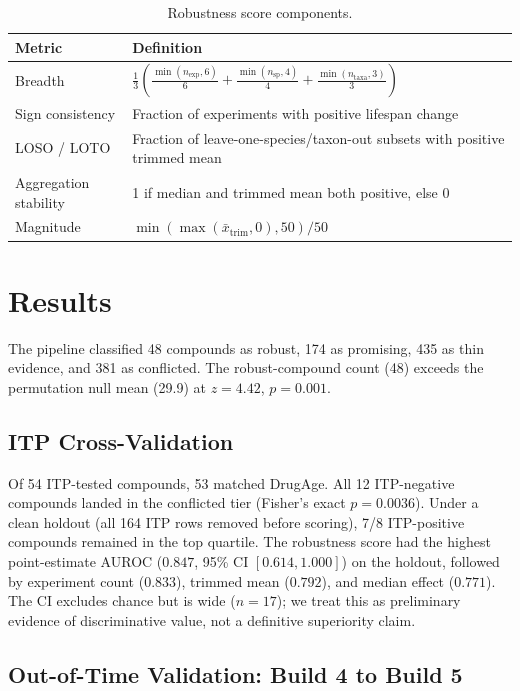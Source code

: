 \documentclass[10pt]{article}
\begin{document}
\begin{table}[H]
\centering
\scriptsize
\begin{tabular}{lp{5.8cm}}
\toprule
Metric & Definition \\
\midrule
Breadth & $\frac{1}{3}(\frac{\min(n_{\text{exp}},6)}{6} + \frac{\min(n_{\text{sp}},4)}{4} + \frac{\min(n_{\text{taxa}},3)}{3})$ \\
Sign consistency & Fraction of experiments with positive lifespan change \\
LOSO / LOTO & Fraction of leave-one-species/taxon-out subsets with positive trimmed mean \\
Aggregation stability & 1 if median and trimmed mean both positive, else 0 \\
Magnitude & $\min(\max(\bar{x}_{\text{trim}}, 0), 50) / 50$ \\
\bottomrule
\end{tabular}
\caption{Robustness score components.}
\label{tab:notation}
\end{table}

\section{Results}

The pipeline classified 48 compounds as robust, 174 as promising, 435 as thin evidence, and 381 as conflicted. The robust-compound count (48) exceeds the permutation null mean (29.9) at $z = 4.42$, $p = 0.001$.

\subsection{ITP Cross-Validation}

Of 54 ITP-tested compounds, 53 matched DrugAge. All 12 ITP-negative compounds landed in the conflicted tier (Fisher's exact $p = 0.0036$). Under a clean holdout (all 164 ITP rows removed before scoring), 7/8 ITP-positive compounds remained in the top quartile. The robustness score had the highest point-estimate AUROC ($0.847$, 95\% CI $[0.614, 1.000]$) on the holdout, followed by experiment count ($0.833$), trimmed mean ($0.792$), and median effect ($0.771$). The CI excludes chance but is wide ($n = 17$); we treat this as preliminary evidence of discriminative value, not a definitive superiority claim.

\subsection{Out-of-Time Validation: Build 4 to Build 5}
\end{document}

